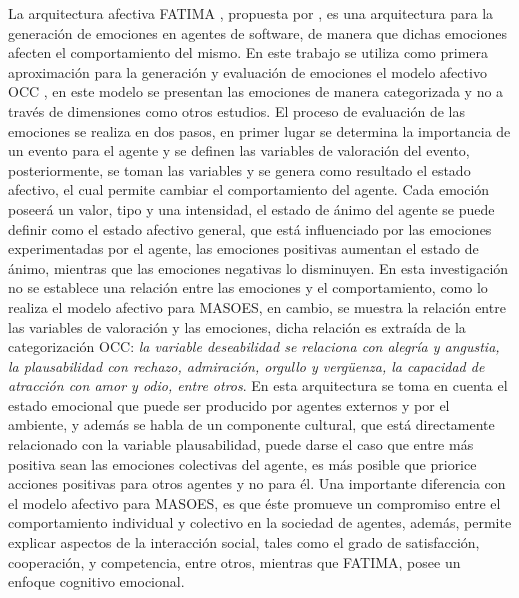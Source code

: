 La arquitectura afectiva FATIMA ,
propuesta por \cite{dias2014}, es una arquitectura para la
generación de emociones en agentes de software, de manera que dichas emociones
afecten el comportamiento del mismo. En este trabajo se utiliza como primera
aproximación para la generación y evaluación de emociones el modelo afectivo OCC
 \citep{ortony1990},
en este modelo se presentan las emociones de manera categorizada y no a través
de dimensiones como otros estudios. El proceso de evaluación de las emociones se
realiza en dos pasos, en primer lugar se determina la importancia de un evento
para el agente y se definen las variables de valoración del evento,
posteriormente, se toman las variables y se genera como resultado el estado
afectivo, el cual permite cambiar el comportamiento del agente. Cada emoción
poseerá un valor, tipo y una intensidad, el estado de ánimo del agente se puede
definir como el estado afectivo general, que está influenciado por las emociones
experimentadas por el agente, las emociones positivas aumentan el estado de
ánimo, mientras que las emociones negativas lo disminuyen. En esta investigación
no se establece una relación entre las emociones y el comportamiento, como lo
realiza el modelo afectivo para MASOES, en cambio, se muestra la relación entre
las variables de valoración  y las emociones, dicha relación es extraída de la
categorización OCC: \textit{la variable deseabilidad se relaciona con alegría y
angustia, la plausabilidad con rechazo, admiración, orgullo y vergüenza, la
capacidad de atracción con amor y odio, entre otros}. En esta arquitectura se
toma en cuenta el estado emocional que puede ser producido por agentes externos
y por el ambiente, y además se habla de un componente cultural, que está
directamente relacionado con la variable plausabilidad, puede darse el caso que
entre más positiva sean las emociones colectivas del agente, es más posible que
priorice acciones positivas para otros agentes y no  para él. Una importante
diferencia con el modelo afectivo para MASOES, es que éste promueve un
compromiso entre el comportamiento individual y colectivo en la sociedad de
agentes,  además, permite explicar aspectos de la interacción social, tales como
el grado de satisfacción, cooperación, y competencia, entre otros, mientras que
FATIMA, posee un enfoque cognitivo emocional.

